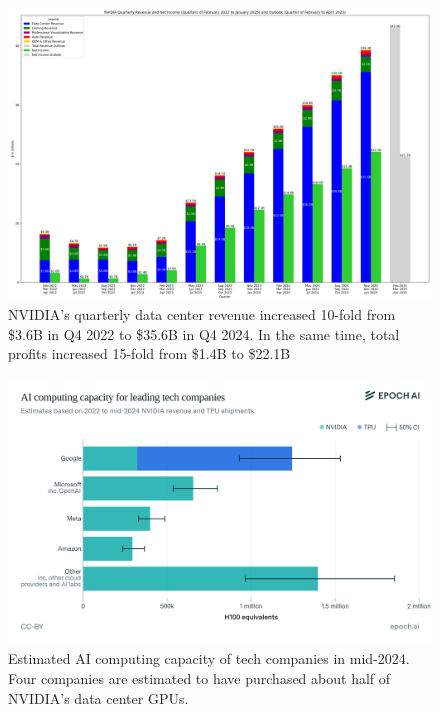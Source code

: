 \documentclass[aspectratio=169]{beamer}
\begin{document}
    \begin{frame}
        \begin{figure}
            \includegraphics[height=0.5\textwidth]{images/nvidia-revenue}
            \caption{NVIDIA's quarterly data center revenue increased 10-fold from \$3.6B in Q4 2022 to \$35.6B in Q4 2024. In the same time, total profits increased 15-fold from \$1.4B to \$22.1B}
        \end{figure}
    \end{frame}
    \begin{frame}
        \begin{figure}
            \includegraphics[height=0.5\textwidth]{images/computing-capacity}
            \caption{Estimated AI computing capacity of tech companies in mid-2024. Four companies are estimated to have purchased about half of NVIDIA's data center GPUs.~\parencite{epoch_ai_machine_learning_hardware_2024}}
        \end{figure}
    \end{frame}
\end{document}
